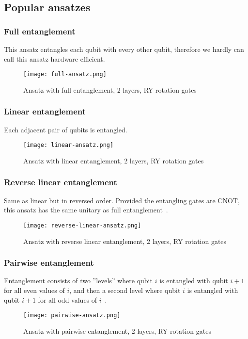 \subsection{Popular ansatzes}

\subsubsection{Full entanglement}
This ansatz entangles each qubit with every other qubit, therefore we hardly can call this ansatz hardware efficient.
\begin{figure}[H]
    \texttt{[image: full-ansatz.png]}
    \caption{Ansatz with full entanglement, 2 layers, RY rotation gates}
\end{figure}

\subsubsection{Linear entanglement}
Each adjacent pair of qubits is entangled. 
\begin{figure}[H]
    \texttt{[image: linear-ansatz.png]}
    \caption{Ansatz with linear entanglement, 2 layers, RY rotation gates}
\end{figure}

\subsubsection{Reverse linear entanglement}
Same as linear but in reversed order. Provided the entangling gates are CNOT, this ansatz has the same unitary as full entanglement~\cite{twolocal}. 
\begin{figure}[H]
    \texttt{[image: reverse-linear-ansatz.png]}
    \caption{Ansatz with reverse linear entanglement, 2 layers, RY rotation gates}
\end{figure}

\subsubsection{Pairwise entanglement}
Entanglement consists of two ''levels'' where qubit $i$ is entangled with qubit $i+1$ for all even values of $i$, and then a second level where qubit $i$ is entangled with qubit $i+1$ for all odd values of $i$~\cite{twolocal}. 
\begin{figure}[H]
    \texttt{[image: pairwise-ansatz.png]}
    \caption{Ansatz with pairwise entanglement, 2 layers, RY rotation gates}
\end{figure}

